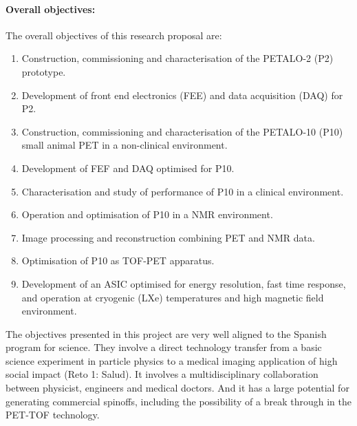 \paragraph{Overall objectives:}
The overall objectives of this research proposal are:

\begin{enumerate}
\item Construction, commissioning and characterisation of the PETALO-2  (P2) prototype. %
\item Development of front end electronics (FEE) and data acquisition (DAQ) for P2. 
\item Construction, commissioning and characterisation of the PETALO-10 (P10) small animal PET in a non-clinical environment.
\item Development of FEF and DAQ optimised for P10.
\item Characterisation and study of performance of P10  in a clinical environment.  
\item Operation and optimisation of  P10 in a NMR environment.
\item Image processing and reconstruction combining PET and NMR data. 
\item Optimisation of  P10 as TOF-PET apparatus.
\item Development of an ASIC optimised for energy resolution, fast time response, and operation at cryogenic (LXe) temperatures and high magnetic field environment. 
\end{enumerate}

The objectives presented in this project are very well aligned to the Spanish program for science. They involve a direct technology transfer from a basic science experiment in particle physics to a medical imaging application of high social impact (Reto 1: Salud). It involves a multidisciplinary collaboration between physicist, engineers and medical doctors. And it has a large potential for generating commercial spinoffs, including the possibility of a break through in the PET-TOF technology.  
